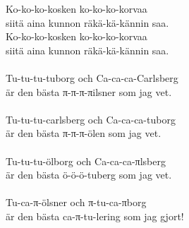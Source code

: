 
            Ko-ko-ko-kosken ko-ko-ko-korvaa \\
            siitä aina kunnon räkä-kä-kännin saa. \\
            Ko-ko-ko-kosken ko-ko-ko-korvaa \\
            siitä aina kunnon räkä-kä-kännin saa. \\
\hspace{10mm} \\
            Tu-tu-tu-tuborg och Ca-ca-ca-Carlsberg \\
            är den bästa π-π-π-πilsner som jag vet. \\
\hspace{10mm} \\
            Tu-tu-tu-carlsberg och Ca-ca-ca-tuborg \\
            är den bästa π-π-π-ölen som jag vet. \\
\hspace{10mm} \\
            Tu-tu-tu-ölborg och Ca-ca-ca-πlsberg \\
            är den bästa ö-ö-ö-tuberg som jag vet. \\
\hspace{10mm} \\
            Tu-ca-π-ölsner och π-tu-ca-πborg \\
            är den bästa ca-π-tu-lering som jag gjort! \\
            \\
